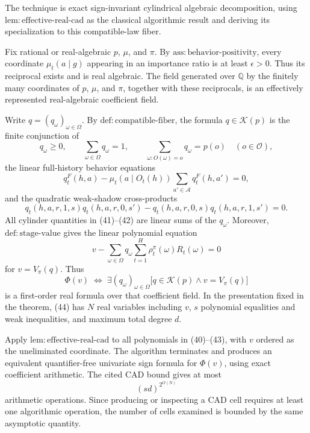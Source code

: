 The technique is exact sign-invariant cylindrical algebraic decomposition, using \(\mathrm{lem{:}effective\text{-}real\text{-}cad}\) as the classical algorithmic result and deriving its specialization to this compatible-law fiber.

Fix rational or real-algebraic \(p\), \(\mu\), and \(\pi\).  By \(\mathrm{ass{:}behavior\text{-}positivity}\), every coordinate \(\mu_t(a\mid g)\) appearing in an importance ratio is at least \(\epsilon>0\).  Thus its reciprocal exists and is real algebraic.  The field generated over \(\mathbb Q\) by the finitely many coordinates of \(p\), \(\mu\), and \(\pi\), together with these reciprocals, is an effectively represented real-algebraic coefficient field.

Write \(q=(q_\omega)_{\omega\in\Omega}\).  By \(\mathrm{def{:}compatible\text{-}fiber}\), the formula \(q\in\mathcal K(p)\) is the finite conjunction of
\[
 q_\omega\geq0,
 \qquad \sum_{\omega\in\Omega}q_\omega=1,
 \qquad
 \sum_{\omega:O(\omega)=o}q_\omega=p(o)\quad(o\in\mathcal O),
\tag{40}
\]
the linear full-history behavior equations
\[
 q_t^F(h,a)-\mu_t(a\mid O_t(h))
 \sum_{a'\in\mathcal A}q_t^F(h,a')=0,
\tag{41}
\]
and the quadratic weak-shadow cross-products
\[
 q_t(h,a,r,1,s)q_t(h,a,r,0,s')
 -q_t(h,a,r,0,s)q_t(h,a,r,1,s')=0.
\tag{42}
\]
All cylinder quantities in (41)--(42) are linear sums of the \(q_\omega\).  Moreover, \(\mathrm{def{:}stage\text{-}value}\) gives the linear polynomial equation
\[
 v-\sum_{\omega\in\Omega}q_\omega
 \sum_{t=1}^H\rho_t^\pi(\omega)R_t(\omega)=0
\tag{43}
\]
for \(v=V_\pi(q)\).  Thus
\[
 \Phi(v)\;\Longleftrightarrow\;
 \exists(q_\omega)_{\omega\in\Omega}
 \bigl[q\in\mathcal K(p)\wedge v=V_\pi(q)\bigr]
\tag{44}
\]
is a first-order real formula over that coefficient field.  In the presentation fixed in the theorem, (44) has \(N\) real variables including \(v\), \(s\) polynomial equalities and weak inequalities, and maximum total degree \(d\).

Apply \(\mathrm{lem{:}effective\text{-}real\text{-}cad}\) to all polynomials in (40)--(43), with \(v\) ordered as the uneliminated coordinate.  The algorithm terminates and produces an equivalent quantifier-free univariate sign formula for \(\Phi(v)\), using exact coefficient arithmetic.  The cited CAD bound gives at most
\[
 (sd)^{2^{O(N)}}
\tag{45}
\]
arithmetic operations.  Since producing or inspecting a CAD cell requires at least one algorithmic operation, the number of cells examined is bounded by the same asymptotic quantity.

